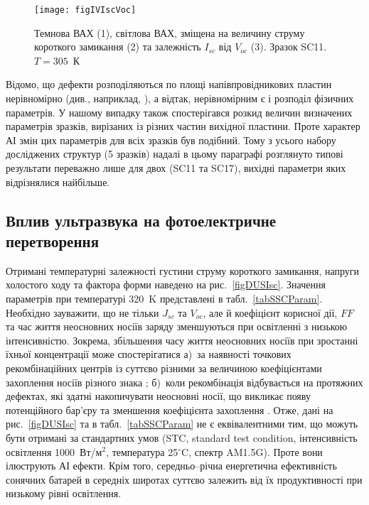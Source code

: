 \begin{figure}
\center
\texttt{[image: figIVIscVoc]}%
\caption{\label{figIVIscVoc}
Темнова ВАХ (1),
світлова ВАХ, зміщена на величину струму короткого замикання (2)
та залежність $I_{sc}$ від $V_{oc}$ (3).
Зразок SC11.
$T=305$~К
}%
\end{figure}

Відомо, що дефекти розподіляються по площі напівпровідникових пластин нерівномірно (див., наприклад, \cite{Oxide:Chen,Oxide_Schon}),
а відтак, нерівномірним є і розподіл фізичних параметрів.
У нашому випадку також спостерігався розкид величин визначених параметрів зразків, вирізаних із різних частин вихідної пластини.
Проте характер АІ змін цих параметрів для всіх зразків був подібний.
Тому з усього набору досліджених структур (5 зразків) надалі в цьому параграфі розглянуто типові результати переважно лише для двох (SC11 та SC17),
вихідні параметри яких відрізнялися найбільше.



\subsection{Вплив ультразвука на фотоелектричне перетворення}

Отримані температурні залежності густини струму короткого замикання, напруги холостого ходу та фактора форми наведено на рис.~\ref{figDUSIsc}.
Значення параметрів при температурі 320~K представлені в табл.~\ref{tabSSCParam}.
Необхідно зауважити, що не тільки $J_{sc}$ та $V_{oc}$, але й коефіцієнт корисної дії, $F\!F$ та час життя неосновних носіїв
заряду зменшуються при освітленні з низькою інтенсивністю\cite{LI:Ruhle,LI:Reich,LI:lifetime}.
Зокрема, збільшення часу життя неосновних носіїв при зростанні їхньої концентрації може спостерігатися
а)~за наявності точкових рекомбінаційних центрів із суттєво різними за величиною коефіцієнтами
захоплення носіїв різного знака \cite{Breitenstein2013,TauOnIph};
б)~коли рекомбінація відбувається на протяжних дефектах, які здатні накопичувати
неосновні носії, що викликає появу потенційного бар'єру та зменшення коефіцієнта захоплення \cite{Robinson1995,Schroter1995}.
Отже, дані на рис.~\ref{figDUSIsc} та в табл.~\ref{tabSSCParam} не є еквівалентними тим, що
можуть бути отримані за стандартних умов (STC, standard test condition, інтенсивність освітлення 1000~Вт/м$^2$,
температура 25$^{\circ}$C, спектр AM1.5G).
Проте вони ілюструють АІ ефекти.
Крім того, середньо--річна енергетична ефективність сонячних батарей в середніх широтах суттєво залежить від
їх продуктивності при низькому рівні освітлення.


